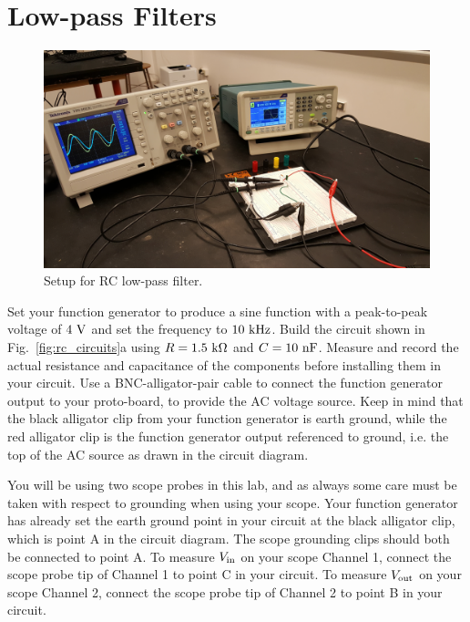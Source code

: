 \section{Low-pass Filters}

\begin{figure}[htbp]
\begin{center}
\includegraphics[height=0.22\textheight]{figs/labs/filters/filter_setup.jpg}
\end{center}
\caption{\label{fig:filter_setup} Setup for RC low-pass filter.}
\end{figure}

Set your function generator to produce a sine function with a
peak-to-peak voltage of $4~\rm V$ and set the frequency to $10~\rm
kHz$.  Build the circuit shown in Fig.~\ref{fig:rc_circuits}a using
$R=1.5~\rm k \Omega$ and $C= 10~\rm nF$.  Measure and record the
actual resistance and capacitance of the components before installing
them in your circuit.  Use a BNC-alligator-pair cable to connect the
function generator output to your proto-board, to provide the AC
voltage source.  Keep in mind that the black alligator clip from your
function generator is earth ground, while the red alligator clip is the
function generator output referenced to ground, i.e. the top of the AC
source as drawn in the circuit diagram.

You will be using two scope probes in this lab, and as always some
care must be taken with respect to grounding when using your scope.
Your function generator has already set the earth ground point in your
circuit at the black alligator clip, which is point A in the circuit
diagram.  The scope grounding clips should both be connected to point
A.  To measure $V_{\rm in}$ on your scope Channel 1, connect the scope
probe tip of Channel 1 to point C in your circuit.  To measure $V_{\rm
  out}$ on your scope Channel 2, connect the scope probe tip of
Channel 2 to point B in your circuit.

